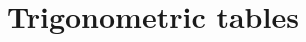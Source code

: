 \documentclass[12pt]  {article}%
\begin{document}
\section{Trigonometric  tables}
%
%
%
\end{document}
